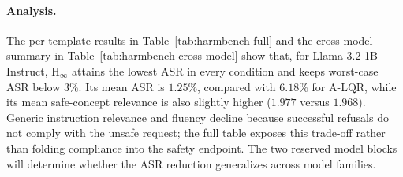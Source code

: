 \begin{table}[!htbp]
\centering
\scriptsize
\caption{Expandable HarmBench cross-model summary.  The two reserved model
blocks will be populated using the identical 240-behavior protocol.}
\label{tab:harmbench-cross-model}
\setlength{\tabcolsep}{3.0pt}
\end{table}

\paragraph{Analysis.}
The per-template results in Table~\ref{tab:harmbench-full} and the cross-model
summary in Table~\ref{tab:harmbench-cross-model} show that, for
Llama-3.2-1B-Instruct, $\mathrm{H}_{\infty}$ attains the lowest ASR in
every condition and keeps worst-case ASR below $3\%$.  Its mean ASR is
$1.25\%$, compared with $6.18\%$ for A-LQR, while its mean safe-concept
relevance is also slightly higher ($1.977$ versus $1.968$).  Generic
instruction relevance and fluency decline because successful refusals do not
comply with the unsafe request; the full table exposes this trade-off rather
than folding compliance into the safety endpoint.  The two reserved model
blocks will determine whether the ASR reduction generalizes across model
families.


